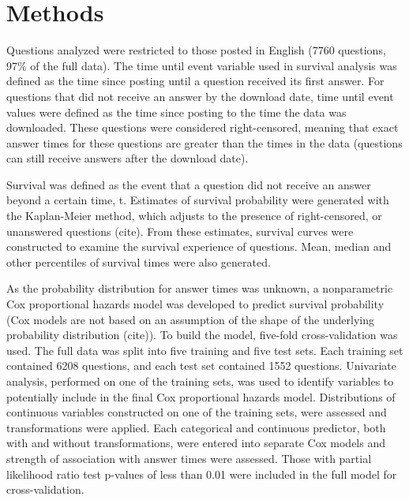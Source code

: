 \documentclass{article}
\begin{document}
\section*{Methods}



Questions analyzed were restricted to those posted in English (7760 questions, 97\% of the full data). The time until event variable used in survival analysis was defined as the time since posting until a question received its first answer. For questions that did not receive an answer by the download date, time until event values were defined as the time since posting to the time the data was downloaded. These questions were considered right-censored, meaning that exact answer times for these questions are greater than the times in the data (questions can still receive answers after the download date). 

Survival was defined as the event that a question did not receive an answer beyond a certain time, t. Estimates of survival probability were generated with the Kaplan-Meier method, which adjusts to the presence of right-censored, or unanswered questions (cite). From these estimates, survival curves were constructed to examine the survival experience of questions. Mean, median and other percentiles of survival times were also generated. 

As the probability distribution for answer times was unknown, a nonparametric Cox proportional hazards model was developed to predict survival probability (Cox models are not based on an assumption of the shape of the underlying probability distribution (cite)). To build the model, five-fold cross-validation was used. The full data was split into five training and five test sets. Each training set contained 6208 questions, and each test set contained 1552 questions. Univariate analysis, performed on one of the training sets, was used to identify variables to potentially include in the final Cox proportional hazards model. Distributions of continuous variables constructed on one of the training sets, were assessed and transformations were applied. Each categorical and continuous predictor, both with and without transformations, were entered into separate Cox models and strength of association with answer times were assessed. Those with partial likelihood ratio test p-values of less than 0.01 were included in the full model for cross-validation.
\end{document}
